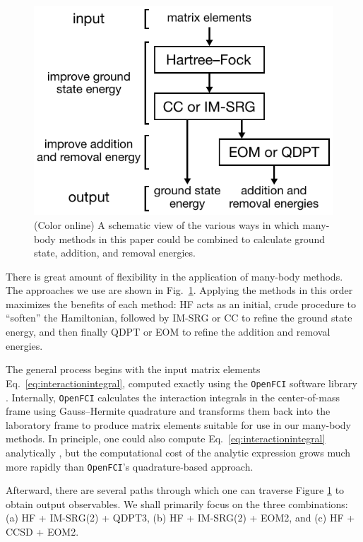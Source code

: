 \begin{figure}
  \centering
  \includegraphics{fig-methods.pdf}
  \caption{(Color online) A schematic view of the various ways in which many-body methods in this paper could be combined to calculate ground state, addition, and removal energies.}
  \label{fig:methods}
\end{figure}

There is great amount of flexibility in the application of many-body methods.  The approaches we use are shown in Fig.\ \ref{fig:methods}.  Applying the methods in this order maximizes the benefits of each method: HF acts as an initial, crude procedure to ``soften'' the Hamiltonian, followed by IM-SRG or CC to refine the ground state energy, and then finally QDPT or EOM to refine the addition and removal energies.

The general process begins with the input matrix elements Eq.\ \eqref{eq:interactionintegral}, computed exactly using the \texttt{OpenFCI} software library \cite{2008arXiv0810.2644K}.  Internally, \texttt{OpenFCI} calculates the interaction integrals in the center-of-mass frame using Gauss--Hermite quadrature and transforms them back into the laboratory frame to produce matrix elements suitable for use in our many-body methods.  In principle, one could also compute Eq.\ \eqref{eq:interactionintegral} analytically \cite{0953-8984-10-3-013}, but the computational cost of the analytic expression grows much more rapidly than \texttt{OpenFCI}'s quadrature-based approach.

Afterward, there are several paths through which one can traverse Figure \ref{fig:methods} to obtain output observables.  We shall primarily focus on the three combinations: (a) HF + IM-SRG(2) + QDPT3, (b) HF + IM-SRG(2) + EOM2, and (c) HF + CCSD + EOM2.

